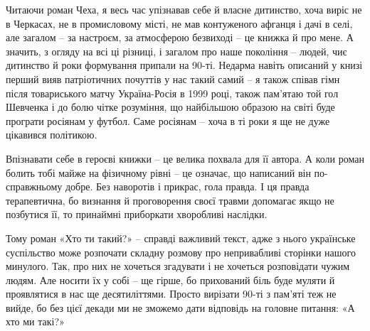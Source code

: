 Читаючи роман Чеха, я весь час упізнавав себе й власне дитинство, хоча виріс не
в Черкасах, не в промисловому місті, не мав контуженого афганця і дачі в селі,
але загалом – за настроєм, за атмосферою безвиході – це книжка й про мене. А
значить, з огляду на всі ці різниці, і загалом про наше покоління – людей, чиє
дитинство й роки формування припали на 90-ті. Недарма навіть описаний у книзі
перший вияв патріотичних почуттів у нас такий самий – я також співав гімн після
товариського матчу Україна-Росія в 1999 році, також пам’ятаю той гол Шевченка і
до болю чітке розуміння, що найбільшою образою на світі буде програти росіянам
у футбол. Саме росіянам – хоча в ті роки я ще не дуже цікавився політикою.

Впізнавати себе в героєві книжки – це велика похвала для її автора. А коли
роман болить тобі майже на фізичному рівні – це означає, що написаний він
по-справжньому добре. Без наворотів і прикрас, гола правда. І ця правда
терапевтична, бо визнання й проговорення своєї травми допомагає якщо не
позбутися її, то принаймні приборкати хворобливі наслідки.

Тому роман «Хто ти такий?» – справді важливий текст, адже з нього українське
суспільство може розпочати складну розмову про непривабливі сторінки нашого
минулого. Так, про них не хочеться згадувати і не хочеться розповідати чужим
людям. Але носити їх у собі – ще гірше, бо прихований біль буде муляти й
проявлятися в нас ще десятиліттями. Просто вирізати 90-ті з пам’яті теж не
вийде, бо без цієї декади ми не зможемо дати відповідь на головне питання:  «А
хто ми такі?»
